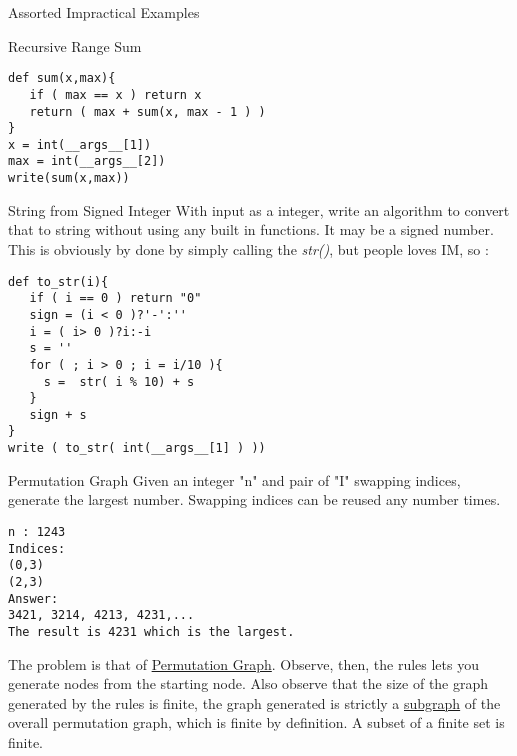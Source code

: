 \begin{section}{Assorted Impractical Examples}
\begin{subsection}{Recursive Range Sum}
\begin{center}\begin{minipage}{\linewidth}
\begin{lstlisting}[style=JexlStyle]
def sum(x,max){
   if ( max == x ) return x
   return ( max + sum(x, max - 1 ) )
}
x = int(__args__[1])
max = int(__args__[2])
write(sum(x,max))
\end{lstlisting}  
\end{minipage}\end{center}

\end{subsection}

\begin{subsection}{String from Signed Integer}
With input as a integer, write an algorithm to convert that to string 
without using any built in functions. It may be a signed number. 
This is obviously by done by simply calling the \emph{str()}, 
but people loves IM, so :

\begin{center}\begin{minipage}{\linewidth}
\begin{lstlisting}[style=JexlStyle]
def to_str(i){
   if ( i == 0 ) return "0"
   sign = (i < 0 )?'-':''
   i = ( i> 0 )?i:-i
   s = '' 
   for ( ; i > 0 ; i = i/10 ){
     s =  str( i % 10) + s 
   } 
   sign + s    
}
write ( to_str( int(__args__[1] ) ))
\end{lstlisting}  
\end{minipage}\end{center}
\end{subsection}

\begin{subsection}{Permutation Graph}
Given an integer "n" and pair of "I" swapping indices, 
generate the largest number. Swapping indices can be reused any number times. 

\begin{lstlisting}[style=all]
n : 1243 
Indices: 
(0,3) 
(2,3) 
Answer: 
3421, 3214, 4213, 4231,...
The result is 4231 which is the largest.
\end{lstlisting}  

The problem is that of \href{https://en.wikipedia.org/wiki/Permutation\_graph}{Permutation Graph}.
Observe, then, the rules lets you generate nodes from the starting node.
Also observe that the size of the graph generated by the rules is finite, 
the graph generated is strictly a 
\href{https://en.wikipedia.org/wiki/Glossary_of_graph_theory\#subgraph}{subgraph} 
of the overall permutation graph, 
which is finite by definition. A subset of a finite set is finite. 


\end{subsection}
\end{section}
